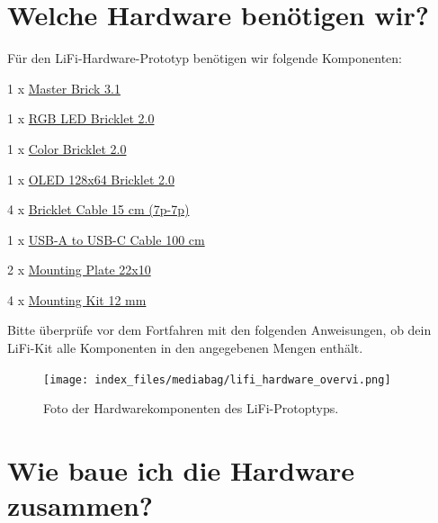 \documentclass[
  letterpaper,
  DIV=11]{scrreprt}
\begin{document}

\section*{Welche Hardware benötigen
wir?}\label{welche-hardware-benuxf6tigen-wir}


Für den LiFi-Hardware-Prototyp benötigen wir folgende Komponenten:

1 x
\href{https://www.tinkerforge.com/en/shop/bricks/master-brick.html}{Master
Brick 3.1}

1 x
\href{https://www.tinkerforge.com/en/shop/rgb-led-v2-bricklet.html}{RGB
LED Bricklet 2.0}

1 x
\href{https://www.tinkerforge.com/en/shop/color-v2-bricklet.html}{Color
Bricklet 2.0}

1 x
\href{https://www.tinkerforge.com/en/shop/oled-128x64-v2-bricklet.html}{OLED
128x64 Bricklet 2.0}

4 x
\href{https://www.tinkerforge.com/en/shop/bricklet-cable-15cm-7p-7p.html}{Bricklet
Cable 15 cm (7p-7p)}

1 x
\href{https://www.tinkerforge.com/en/shop/accessories/cable/usb-a-to-usb-c-cable-100cm.html}{USB-A
to USB-C Cable 100 cm}

2 x
\href{https://www.tinkerforge.com/en/shop/accessories/mounting/mounting-plate-22x10.html}{Mounting
Plate 22x10}

4 x
\href{https://www.tinkerforge.com/en/shop/accessories/mounting/mounting-kit-12mm.html}{Mounting
Kit 12 mm}

Bitte überprüfe vor dem Fortfahren mit den folgenden Anweisungen, ob
dein LiFi-Kit alle Komponenten in den angegebenen Mengen enthält.

\begin{figure}[H]

{\centering \texttt{[image: index\_files/mediabag/lifi\_hardware\_overvi.png]}

}

\caption{Foto der Hardwarekomponenten des LiFi-Protoptyps.}

\end{figure}%

\section*{Wie baue ich die Hardware
zusammen?}\label{wie-baue-ich-die-hardware-zusammen}
\end{document}
